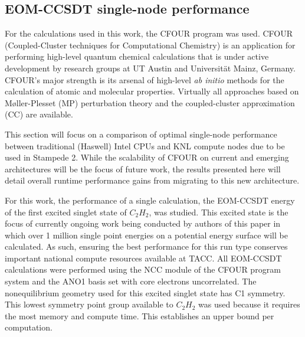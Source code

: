 \subsection{EOM-CCSDT single-node performance}
\label{sec:cfour}

For the calculations used in this work, the CFOUR \cite{cfour:08} program was
used. CFOUR (Coupled-Cluster techniques for Computational Chemistry) is an
application for performing high-level quantum chemical calculations that is
under active development by research groups at UT Austin and Universit\"{a}t
Mainz, Germany. CFOUR's major strength is its arsenal of high-level \emph{ab
initio} methods for the calculation of atomic and molecular properties.
Virtually all approaches based on M\o ller-Plesset (MP) perturbation theory and
the coupled-cluster approximation (CC) are available.

This section will focus on a comparison of optimal single-node performance
between traditional (Haswell) Intel CPUs and KNL compute nodes due to be used
in Stampede 2.  While the scalability of CFOUR on current and emerging
architectures will be the focus of future work, the results presented here will
detail overall runtime performance gains from migrating to this new
architecture.

For this work, the performance of a single calculation, the EOM-CCSDT energy of the first
excited singlet state of $C_2H_2$, was studied.
This excited state is the focus of currently ongoing work being conducted by authors of this paper
in which over 1 million single point energies on a potential energy surface will be calculated.
As such, ensuring the best performance for this run type conserves important national compute resources
available at TACC.  All EOM-CCSDT calculations were performed
using the NCC module\cite{ncc:15} of the CFOUR program system and the ANO1 basis set\cite{ano1:87} with core
electrons uncorrelated. The nonequilibrium geometry used for this excited singlet state has C1 symmetry.
This lowest symmetry point group available to $C_2H_2$ was used because it requires the most memory
and compute time. This establishes an upper bound per computation.

